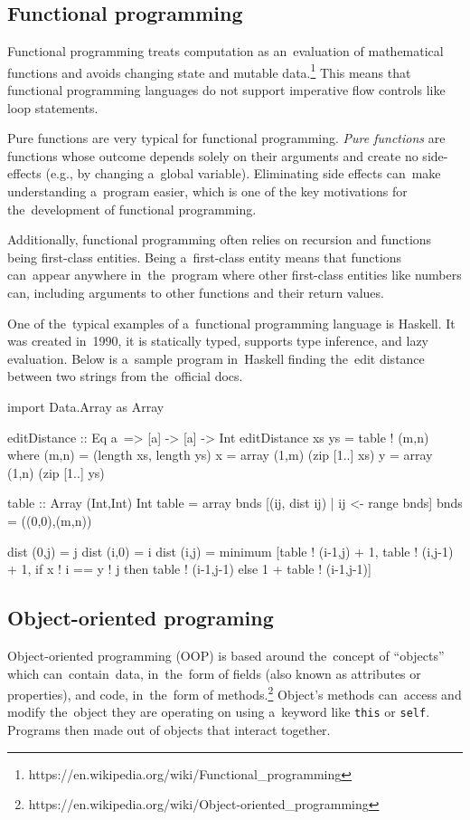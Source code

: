 \subsection{Functional programming}
Functional programming treats computation as an~evaluation of mathematical functions and avoids changing state and mutable
data.\footnote{https://en.wikipedia.org/wiki/Functional\_programming}
This means that functional programming languages do not support imperative flow controls like loop statements.

Pure functions are very typical for functional programming. \emph{Pure functions} are functions whose outcome depends solely on their arguments
and create no side-effects (e.g., by changing a~global variable). Eliminating side effects can~make understanding a~program easier, which is one of the
key motivations for the~development of functional programming.

Additionally, functional programming often relies on recursion and functions being first-class entities. Being a~first-class entity means that functions can~appear
anywhere in~the~program where other first-class entities like numbers can, including arguments to other functions and their return values.

One of the~typical examples of a~functional programming language is Haskell. It was created in~1990, it is statically typed, supports type inference,
and lazy evaluation. Below is a~sample program in~Haskell finding the~edit distance between two strings from the~official docs.
\begin{code}
import Data.Array as Array

editDistance :: Eq a~=> [a] -> [a] -> Int
editDistance xs ys = table ! (m,n)
    where
    (m,n) = (length xs, length ys)
    x     = array (1,m) (zip [1..] xs)
    y     = array (1,n) (zip [1..] ys)
    
    table :: Array (Int,Int) Int
    table = array bnds [(ij, dist ij) | ij <- range bnds]
    bnds  = ((0,0),(m,n))
    
    dist (0,j) = j
    dist (i,0) = i
    dist (i,j) = minimum [table ! (i-1,j) + 1, table ! (i,j-1) + 1,
        if x ! i == y ! j
            then table ! (i-1,j-1)
            else 1 + table ! (i-1,j-1)]
\end{code}

\subsection{Object-oriented programing}
Object-oriented programming (OOP) is based around the~concept of ``objects'' which can~contain~data, in~the~form of fields (also known as attributes or properties),
and code, in~the~form of methods.\footnote{https://en.wikipedia.org/wiki/Object-oriented\_programming} Object's methods can~access and modify the~object they are
operating on using a~keyword like \texttt{this} or \texttt{self}. Programs then made out of objects that interact together.

